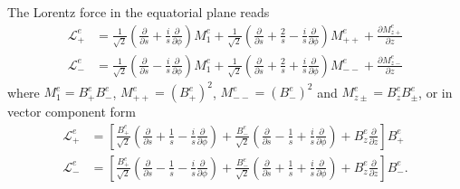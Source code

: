 %
The Lorentz force in the equatorial plane reads
%
\begin{equation}\label{eqn:lorentz-e-canonical}
\begin{aligned}
    \mathcal{L}_+^e &= \frac{1}{\sqrt{2}} \left(\frac{\partial}{\partial s} + \frac{i}{s} \frac{\partial}{\partial \phi}\right) M_1^e + \frac{1}{\sqrt{2}} \left(\frac{\partial}{\partial s} + \frac{2}{s} - \frac{i}{s} \frac{\partial}{\partial \phi}\right) M_{++}^e + \frac{\partial M_{z+}^e}{\partial z} \\ 
    \mathcal{L}_-^e &= \frac{1}{\sqrt{2}} \left(\frac{\partial}{\partial s} - \frac{i}{s} \frac{\partial}{\partial \phi}\right) M_1^e + \frac{1}{\sqrt{2}} \left(\frac{\partial}{\partial s} + \frac{2}{s} + \frac{i}{s} \frac{\partial}{\partial \phi}\right) M_{--}^e + \frac{\partial M_{z-}^e}{\partial z}
\end{aligned}
\end{equation}
%
where $M_1^e = B_+^e B_-^e$, $M_{++}^e = (B_+^e)^2$, $M_{--}^e = (B_-^e)^2$ and $M_{z\pm}^e = B_z^e B_{\pm}^e$, or in vector component form
%
\begin{equation}\label{eqn:lorentz-ev-canonical}
\begin{aligned}
    \mathcal{L}_+^e &= \left[\frac{B_+^e}{\sqrt{2}}\left(\frac{\partial}{\partial s} + \frac{1}{s} - \frac{i}{s}\frac{\partial}{\partial \phi}\right) + \frac{B_-^e}{\sqrt{2}}\left(\frac{\partial}{\partial s} - \frac{1}{s} + \frac{i}{s}\frac{\partial}{\partial \phi}\right) + B_z^e \frac{\partial}{\partial z}\right] B_+^e \\ 
    \mathcal{L}_-^e &= \left[\frac{B_+^e}{\sqrt{2}}\left(\frac{\partial}{\partial s} - \frac{1}{s} - \frac{i}{s}\frac{\partial}{\partial \phi}\right) + \frac{B_-^e}{\sqrt{2}}\left(\frac{\partial}{\partial s} + \frac{1}{s} + \frac{i}{s}\frac{\partial}{\partial \phi}\right) + B_z^e \frac{\partial}{\partial z}\right] B_-^e.
\end{aligned}
\end{equation}
%
